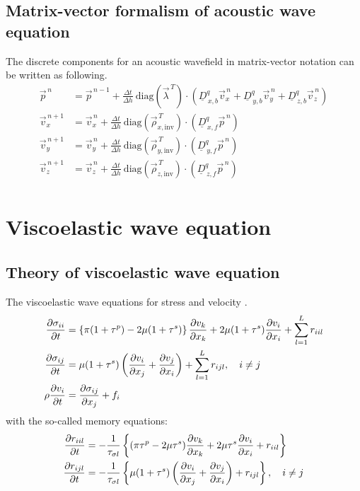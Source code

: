\documentclass[pdftex,a4paper,parskip,listof=totoc,bibliography=totoc,onehalfspacing,12pt]{scrreprt}
\begin{document}
\section{Matrix-vector formalism of acoustic wave equation}
The discrete components for an acoustic wavefield in matrix-vector notation can be written as following. 
\begin{align*}
	\vec{p}^{\,n} &= \vec{p}^{\,n-1} + \frac{\Delta t}{\Delta h}~ \mathrm{diag} \left( \vec{\lambda}^{\,T} \right) \cdot \left( \underline{D}_{\,x,b}^q \vec{v}_x^{\,n} +\underline{D}_{\,y,b}^q \vec{v}_y^{\,n} + \underline{D}_{\,z,b}^q \vec{v}_z^{\,n} \right) \\
	\vec{v}_x^{\,n+1} &= \vec{v}_x^{\,n} + \frac{\Delta t}{\Delta h} ~ \mathrm{diag} \left( \vec{\rho}_{x,\mathrm{inv}}^{\,T} \right) \cdot \left( \underline{D}_{\,x,f}^q \vec{p}^{\,n}  \right)\\
	\vec{v}_y^{\,n+1} &= \vec{v}_y^{\,n} + \frac{\Delta t}{\Delta h} ~ \mathrm{diag} \left( \vec{\rho}_{y,\mathrm{inv}}^{\,T} \right) \cdot \left( \underline{D}_{\,y,f}^q \vec{p}^{\,n} \right)\\
	\vec{v}_z^{\,n+1} &= \vec{v}_z^{\,n} + \frac{\Delta t}{\Delta h} ~ \mathrm{diag}  \left( \vec{\rho}_{z,\mathrm{inv}}^{\,T} \right) \cdot\left( \underline{D}_{\,z,f}^q \vec{p}^{\,n} \right)\\
\end{align*}

\chapter{Viscoelastic wave equation}
\label{sec:Viscoelastic_wave_equation}

\section{Theory of viscoelastic wave equation}
The viscoelastic wave equations for stress and velocity \citep{bohlen2002parallel}.
\begin{align}
\label{eqn:elastic_wave_stress_xx}
\pdv{\sigma_{ii}}{t} &= \left\{ \pi (1+\tau^p)-2\mu (1+\tau^s) \right\} \pdv{v_k}{x_k} + 2\mu (1+\tau^s) \pdv{v_i}{x_i} + \sum_{l=1}^L r_{iil}\\
\pdv{\sigma_{ij}}{t} &= \mu (1+\tau^s) \left(\pdv{v_i}{x_j} +\pdv{v_j}{x_i}\right) + \sum_{l=1}^L r_{ijl}, \quad i \neq j\\
\rho\pdv{v_i}{t}&=\pdv{\sigma_{ij}}{x_j}+ f_i
\end{align}
with the so-called memory equations:
\begin{align}
\pdv{r_{iil}}{t} &= -\frac{1}{\tau_{\sigma l}} \left\{ (\pi \tau^p-2\mu \tau^s) \pdv{v_k}{x_k} + 2\mu \tau^s \pdv{v_i}{x_i} + r_{iil} \right\}\\
\pdv{r_{ijl}}{t} &= -\frac{1}{\tau_{\sigma l}} \left\{ \mu (1+\tau^s) \left(\pdv{v_i}{x_j} +\pdv{v_j}{x_i}\right) + r_{ijl} \right\}, \quad i \neq j
\end{align}
\end{document}
